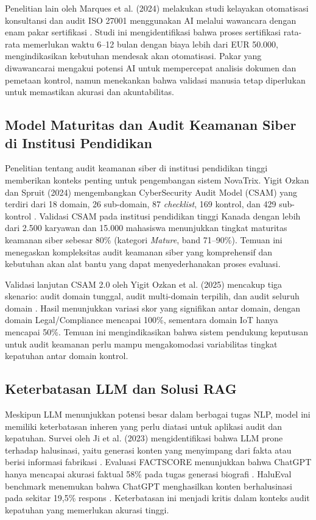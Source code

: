 \documentclass[bachelor,bahasa]{thesisdtetiugm}
\begin{document}
Penelitian lain oleh Marques et al. (2024) melakukan studi kelayakan otomatisasi konsultansi dan audit ISO 27001 menggunakan AI melalui wawancara dengan enam pakar sertifikasi \cite{automatingiso27001}. Studi ini mengidentifikasi bahwa proses sertifikasi rata-rata memerlukan waktu 6--12 bulan dengan biaya lebih dari EUR 50.000, mengindikasikan kebutuhan mendesak akan otomatisasi. Pakar yang diwawancarai mengakui potensi AI untuk mempercepat analisis dokumen dan pemetaan kontrol, namun menekankan bahwa validasi manusia tetap diperlukan untuk memastikan akurasi dan akuntabilitas.

\subsection{Model Maturitas dan Audit Keamanan Siber di Institusi Pendidikan}

Penelitian tentang audit keamanan siber di institusi pendidikan tinggi memberikan konteks penting untuk pengembangan sistem NovaTrix. Yigit Ozkan dan Spruit (2024) mengembangkan CyberSecurity Audit Model (CSAM) yang terdiri dari 18 domain, 26 sub-domain, 87 \textit{checklist}, 169 kontrol, dan 429 sub-kontrol \cite{csam2024}. Validasi CSAM pada institusi pendidikan tinggi Kanada dengan lebih dari 2.500 karyawan dan 15.000 mahasiswa menunjukkan tingkat maturitas keamanan siber sebesar 80\% (kategori \textit{Mature}, band 71--90\%). Temuan ini menegaskan kompleksitas audit keamanan siber yang komprehensif dan kebutuhan akan alat bantu yang dapat menyederhanakan proses evaluasi.

Validasi lanjutan CSAM 2.0 oleh Yigit Ozkan et al. (2025) mencakup tiga skenario: audit domain tunggal, audit multi-domain terpilih, dan audit seluruh domain \cite{csam2validation2024}. Hasil menunjukkan variasi skor yang signifikan antar domain, dengan domain Legal/Compliance mencapai 100\%, sementara domain IoT hanya mencapai 50\%. Temuan ini mengindikasikan bahwa sistem pendukung keputusan untuk audit keamanan perlu mampu mengakomodasi variabilitas tingkat kepatuhan antar domain kontrol.

\subsection{Keterbatasan LLM dan Solusi RAG}

Meskipun LLM menunjukkan potensi besar dalam berbagai tugas NLP, model ini memiliki keterbatasan inheren yang perlu diatasi untuk aplikasi audit dan kepatuhan. Survei oleh Ji et al. (2023) mengidentifikasi bahwa LLM prone terhadap halusinasi, yaitu generasi konten yang menyimpang dari fakta atau berisi informasi fabrikasi \cite{hallucinationsurvey}. Evaluasi FACTSCORE menunjukkan bahwa ChatGPT hanya mencapai akurasi faktual 58\% pada tugas generasi biografi \cite{factscore2023}. HaluEval benchmark menemukan bahwa ChatGPT menghasilkan konten berhalusinasi pada sekitar 19,5\% respons \cite{halueval2023}. Keterbatasan ini menjadi kritis dalam konteks audit kepatuhan yang memerlukan akurasi tinggi.
\end{document}
